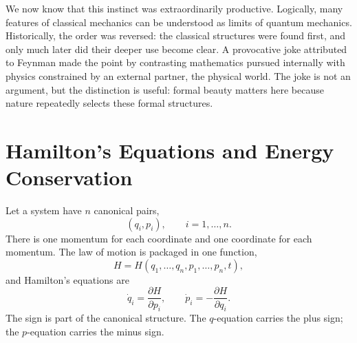 We now know that this instinct was extraordinarily productive.  Logically,
many features of classical mechanics can be understood as limits of quantum
mechanics.  Historically, the order was reversed: the classical structures
were found first, and only much later did their deeper use become clear.  A
provocative joke attributed to Feynman made the point by contrasting
mathematics pursued internally with physics constrained by an external partner,
the physical world.  The joke is not an argument, but the distinction is useful:
formal beauty matters here because nature repeatedly selects these formal
structures.

\begin{classroomqa}
\end{classroomqa}

\section{Hamilton's Equations and Energy Conservation}

Let a system have \(n\) canonical pairs,
\begin{equation}
  (q_i,p_i),\qquad i=1,\ldots,n.
  \label{eq:l7-canonical-pairs}
\end{equation}
There is one momentum for each coordinate and one coordinate for each momentum.
The law of motion is packaged in one function,
\begin{equation}
  H=H(q_1,\ldots,q_n,p_1,\ldots,p_n,t),
  \label{eq:l7-hamiltonian}
\end{equation}
and Hamilton's equations are
\begin{equation}
  \boxed{
  \dot q_i=\frac{\partial H}{\partial p_i},
  \qquad
  \dot p_i=-\frac{\partial H}{\partial q_i}.}
  \label{eq:l7-hamilton-equations}
\end{equation}
The sign is part of the canonical structure.  The \(q\)-equation carries the
plus sign; the \(p\)-equation carries the minus sign.

